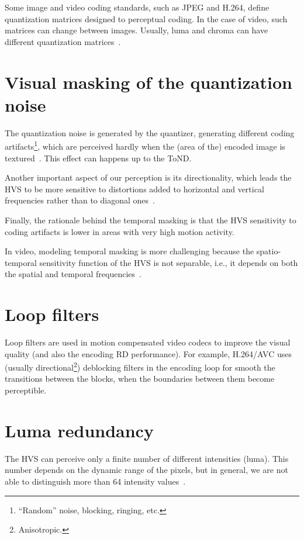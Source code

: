 Some image and video coding standards, such as JPEG and H.264, define
quantization matrices designed to perceptual coding. In the case of
video, such matrices can change between images. Usually, luma and
chroma can have different quantization
matrices~\cite{naccari2014perceptually}.

\section{Visual masking of the quantization noise}

The quantization noise is generated by the quantizer, generating
different coding artifacts\footnote{``Random'' noise, blocking,
  ringing, etc.}, which are perceived hardly when the (area of the)
encoded image is textured~\cite{wu2017digital}. This effect can
happens up to the ToND.

Another important aspect of our perception is its directionality,
which leads the HVS to be more sensitive to distortions added to
horizontal and vertical frequencies rather than to diagonal
ones~\cite{naccari2014perceptually}.

Finally, the rationale behind the temporal masking is that the HVS
sensitivity to coding artifacts is lower in areas with very high
motion activity.

In video, modeling temporal masking is more challenging because
the spatio-temporal sensitivity function of the HVS is not separable,
i.e., it depends on both the spatial and temporal
frequencies~\cite{naccari2014perceptually}.

\section{Loop filters}

Loop filters are used in motion compensated video codecs to improve
the visual quality (and also the encoding RD performance). For
example, H.264/AVC uses (usually directional\footnote{Anisotropic.})
deblocking filters in the encoding loop for smooth the transitions
between the blocks, when the boundaries between them become
perceptible.

\section{Luma redundancy}

The HVS can perceive only a finite number of different intensities
(luma). This number depends on the dynamic range of the pixels, but in
general, we are not able to distinguish more than 64 intensity
values~\cite{vruiz__visual_redundancy}.


